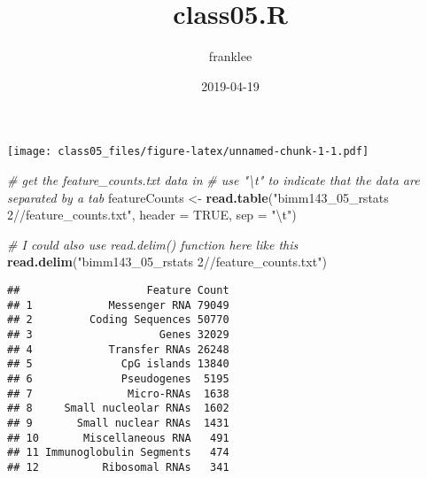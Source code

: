 \documentclass[]{article}
\title{class05.R}
\author{franklee}
\date{2019-04-19}
\newenvironment{Shaded}{\begin{snugshade}}{\end{snugshade}}
\newcommand{\KeywordTok}[1]{\textcolor[rgb]{0.13,0.29,0.53}{\textbf{#1}}}
\newcommand{\DataTypeTok}[1]{\textcolor[rgb]{0.13,0.29,0.53}{#1}}
\newcommand{\DecValTok}[1]{\textcolor[rgb]{0.00,0.00,0.81}{#1}}
\newcommand{\FloatTok}[1]{\textcolor[rgb]{0.00,0.00,0.81}{#1}}
\newcommand{\CharTok}[1]{\textcolor[rgb]{0.31,0.60,0.02}{#1}}
\newcommand{\StringTok}[1]{\textcolor[rgb]{0.31,0.60,0.02}{#1}}
\newcommand{\CommentTok}[1]{\textcolor[rgb]{0.56,0.35,0.01}{\textit{#1}}}
\newcommand{\OtherTok}[1]{\textcolor[rgb]{0.56,0.35,0.01}{#1}}
\newcommand{\OperatorTok}[1]{\textcolor[rgb]{0.81,0.36,0.00}{\textbf{#1}}}
\newcommand{\NormalTok}[1]{#1}
\begin{document}
\maketitle

\begin{Shaded}
\end{Shaded}

\texttt{[image: class05\_files/figure-latex/unnamed-chunk-1-1.pdf]}

\begin{Shaded}
\begin{Highlighting}[]
\CommentTok{# get the feature_counts.txt data in}
\CommentTok{# use "\textbackslash{}t" to indicate that the data are separated by a tab}
\NormalTok{featureCounts <-}\StringTok{ }\KeywordTok{read.table}\NormalTok{(}\StringTok{"bimm143_05_rstats 2//feature_counts.txt"}\NormalTok{,}
                            \DataTypeTok{header =} \OtherTok{TRUE}\NormalTok{, }\DataTypeTok{sep =} \StringTok{"}\CharTok{\textbackslash{}t}\StringTok{"}\NormalTok{)}

\CommentTok{# I could also use read.delim() function here like this}
\KeywordTok{read.delim}\NormalTok{(}\StringTok{"bimm143_05_rstats 2//feature_counts.txt"}\NormalTok{)}
\end{Highlighting}
\end{Shaded}

\begin{verbatim}
##                    Feature Count
## 1            Messenger RNA 79049
## 2         Coding Sequences 50770
## 3                    Genes 32029
## 4            Transfer RNAs 26248
## 5              CpG islands 13840
## 6              Pseudogenes  5195
## 7               Micro-RNAs  1638
## 8     Small nucleolar RNAs  1602
## 9       Small nuclear RNAs  1431
## 10       Miscellaneous RNA   491
## 11 Immunoglobulin Segments   474
## 12          Ribosomal RNAs   341
\end{verbatim}
\end{document}
